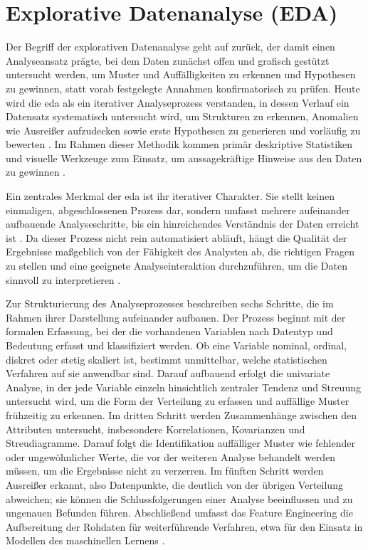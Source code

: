 \section{Explorative Datenanalyse (EDA)}
\label{sec:eda}
Der Begriff der explorativen Datenanalyse geht auf \textcite{tukey1977eda} zurück, der damit einen Analyseansatz prägte, bei dem Daten zunächst offen und grafisch gestützt untersucht werden, um Muster und Auffälligkeiten zu erkennen und Hypothesen zu gewinnen, statt vorab festgelegte Annahmen konfirmatorisch zu prüfen. Heute wird die \gls{eda} als ein iterativer Analyseprozess verstanden, in dessen Verlauf ein Datensatz systematisch untersucht wird, um Strukturen zu erkennen, Anomalien wie Ausreißer aufzudecken sowie erste Hypothesen zu generieren und vorläufig zu bewerten \parencite{langer_towards_2019}. Im Rahmen dieser Methodik kommen primär deskriptive Statistiken und visuelle Werkzeuge zum Einsatz, um aussagekräftige Hinweise aus den Daten zu gewinnen \parencite{rahmany_comparing_2020}.

Ein zentrales Merkmal der \gls{eda} ist ihr iterativer Charakter. Sie stellt keinen einmaligen, abgeschlossenen Prozess dar, sondern umfasst mehrere aufeinander aufbauende Analyseschritte, bis ein hinreichendes Verständnis der Daten erreicht ist \parencite{rahmany_comparing_2020}. Da dieser Prozess nicht rein automatisiert abläuft, hängt die Qualität der Ergebnisse maßgeblich von der Fähigkeit des Analysten ab, die richtigen Fragen zu stellen und eine geeignete Analyseinteraktion durchzuführen, um die Daten sinnvoll zu interpretieren \parencite{langer_towards_2019}.

Zur Strukturierung des Analyseprozesses beschreiben \textcite{rahmany_comparing_2020} sechs Schritte, die im Rahmen ihrer Darstellung aufeinander aufbauen. Der Prozess beginnt mit der formalen Erfassung, bei der die vorhandenen Variablen nach Datentyp und Bedeutung erfasst und klassifiziert werden. Ob eine Variable nominal, ordinal, diskret oder stetig skaliert ist, bestimmt unmittelbar, welche statistischen Verfahren auf sie anwendbar sind. Darauf aufbauend erfolgt die univariate Analyse, in der jede Variable einzeln hinsichtlich zentraler Tendenz und Streuung untersucht wird, um die Form der Verteilung zu erfassen und auffällige Muster frühzeitig zu erkennen. Im dritten Schritt werden Zusammenhänge zwischen den Attributen untersucht, insbesondere Korrelationen, Kovarianzen und Streudiagramme. Darauf folgt die Identifikation auffälliger Muster wie fehlender oder ungewöhnlicher Werte, die vor der weiteren Analyse behandelt werden müssen, um die Ergebnisse nicht zu verzerren. Im fünften Schritt werden Ausreißer erkannt, also Datenpunkte, die deutlich von der übrigen Verteilung abweichen; sie können die Schlussfolgerungen einer Analyse beeinflussen und zu ungenauen Befunden führen. Abschließend umfasst das Feature Engineering die Aufbereitung der Rohdaten für weiterführende Verfahren, etwa für den Einsatz in Modellen des maschinellen Lernens \parencite{rahmany_comparing_2020}.

